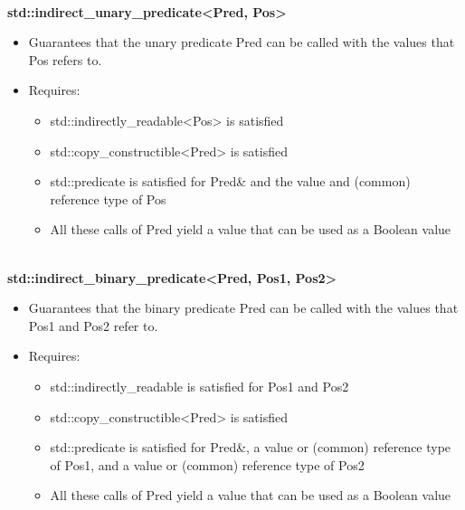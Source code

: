 \noindent
\hspace*{\fill} \\ %
\textbf{std::indirect\_unary\_predicate<Pred, Pos>}

\begin{itemize}
\item
Guarantees that the unary predicate Pred can be called with the values that Pos refers to.

\item
Requires:
\begin{itemize}
\item
std::indirectly\_readable<Pos> is satisfied

\item
std::copy\_constructible<Pred> is satisfied

\item
std::predicate is satisfied for Pred\& and the value and (common) reference type of Pos

\item
All these calls of Pred yield a value that can be used as a Boolean value
\end{itemize}
\end{itemize}


\noindent
\hspace*{\fill} \\ %
\textbf{std::indirect\_binary\_predicate<Pred, Pos1, Pos2>}

\begin{itemize}
\item
Guarantees that the binary predicate Pred can be called with the values that Pos1 and Pos2 refer to.

\item
Requires:
\begin{itemize}
\item
std::indirectly\_readable is satisfied for Pos1 and Pos2

\item
std::copy\_constructible<Pred> is satisfied

\item
std::predicate is satisfied for Pred\&, a value or (common) reference type of Pos1, and a value or (common) reference type of Pos2

\item
All these calls of Pred yield a value that can be used as a Boolean value
\end{itemize}
\end{itemize}

